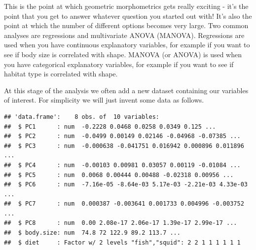 \documentclass[]{book}
\newenvironment{Shaded}{\begin{snugshade}}{\end{snugshade}}
\newcommand{\KeywordTok}[1]{\textcolor[rgb]{0.13,0.29,0.53}{\textbf{{#1}}}}
\newcommand{\DataTypeTok}[1]{\textcolor[rgb]{0.13,0.29,0.53}{{#1}}}
\newcommand{\DecValTok}[1]{\textcolor[rgb]{0.00,0.00,0.81}{{#1}}}
\newcommand{\StringTok}[1]{\textcolor[rgb]{0.31,0.60,0.02}{{#1}}}
\newcommand{\CommentTok}[1]{\textcolor[rgb]{0.56,0.35,0.01}{\textit{{#1}}}}
\newcommand{\NormalTok}[1]{{#1}}
\begin{document}
This is the point at which geometric morphometrics gets really exciting
- it's the point that you get to answer whatever question you started
out with! It's also the point at which the number of different options
becomes very large. Two common analyses are regressions and multivariate
ANOVA (MANOVA). Regressions are used when you have continuous
explanatory variables, for example if you want to see if body size is
correlated with shape. MANOVA (or ANOVA) is used when you have
categorical explanatory variables, for example if you want to see if
habitat type is correlated with shape.

At this stage of the analysis we often add a new dataset containing our
variables of interest. For simplicity we will just invent some data as
follows.

\begin{Shaded}
\end{Shaded}

\begin{verbatim}
## 'data.frame':    8 obs. of  10 variables:
##  $ PC1      : num  -0.2228 0.0468 0.0258 0.0349 0.125 ...
##  $ PC2      : num  -0.0499 0.00149 0.02146 -0.04968 -0.07385 ...
##  $ PC3      : num  -0.000638 -0.041751 0.016942 0.000896 0.011896 ...
##  $ PC4      : num  -0.00103 0.00981 0.03057 0.00119 -0.01084 ...
##  $ PC5      : num  0.0068 0.00444 0.00488 -0.02318 0.00956 ...
##  $ PC6      : num  -7.16e-05 -8.64e-03 5.17e-03 -2.21e-03 4.33e-03 ...
##  $ PC7      : num  0.000387 -0.003641 0.001733 0.004996 -0.003752 ...
##  $ PC8      : num  0.00 2.08e-17 2.06e-17 1.39e-17 2.99e-17 ...
##  $ body.size: num  74.8 72 122.9 89.2 113.7 ...
##  $ diet     : Factor w/ 2 levels "fish","squid": 2 2 1 1 1 1 1 1
\end{verbatim}
\end{document}
